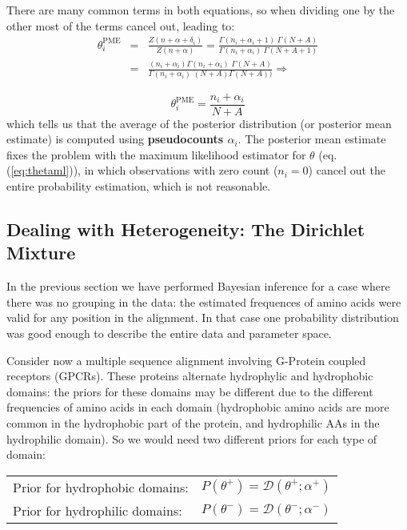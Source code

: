 There are many common terms in both equations, so when dividing one by the other most of the terms cancel out, leading to:
\begin{eqnarray}
\theta_i^{\text{PME}} & = &
\frac{Z(n + \alpha + \delta_i)}{Z(n + \alpha)}
=
\frac{\Gamma(n_i + \alpha_i + 1) \; \Gamma(N + A)}
     {\Gamma(n_i + \alpha_i)     \; \Gamma(N + A + 1)}
\\
& = &
\frac{(n_i + \alpha_i) \Gamma(n_i + \alpha_i) \; \Gamma(N + A)}
     {\Gamma(n_i + \alpha_i)     \; (N + A) \Gamma(N + A))} \Rightarrow
\end{eqnarray}

\begin{equation}
\boxed{\theta_i^{\text{PME}} = \frac{n_i + \alpha_i}{N+A}}
\label{eq:theta:pseudo}
\end{equation}
which tells us that the average of the posterior distribution (or posterior mean estimate) is computed using {\bf pseudocounts $\alpha_i$}. The posterior mean estimate fixes the problem with the maximum likelihood estimator for $\theta$ (eq. (\ref{eq:thetaml})), in which observations with zero count ($n_i=0$) cancel out the entire probability estimation, which is not reasonable.

\subsection{Dealing with Heterogeneity: The Dirichlet Mixture}

In the previous section we have performed Bayesian inference for a case where there was no grouping in the data: the estimated frequences of amino acids were valid for any position in the alignment. In that case one probability distribution was good enough to describe the entire data and parameter space.

Consider now a multiple sequence alignment involving G-Protein coupled receptors (GPCRs). These proteins alternate hydrophylic and hydrophobic domains: the priors for these domains may be different due to the different frequencies of amino acids in each domain (hydrophobic amino acids are more common in the hydrophobic part of the protein, and hydrophilic AAs in the hydrophilic domain). So we would need two different priors for each type of domain:
%
\begin{center}
\begin{tabular}{ll}
Prior for hydrophobic domains: & 
$P(\theta^+) = \mathcal{D}(\theta^+ ; \alpha^+)$ \\
Prior for hydrophilic domains: &
$P(\theta^-) = \mathcal{D}(\theta^- ; \alpha^-)$
\end{tabular}
\end{center}

